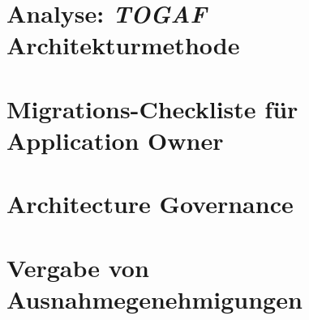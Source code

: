 \section{Analyse: \textit{TOGAF} Architekturmethode}
	\label{sec:analyse}
	

\section{Migrations-Checkliste für Application Owner}
	\label{sec:checkliste}
	

\section{Architecture Governance}
	\label{sec:governance}
	

\section{Vergabe von Ausnahmegenehmigungen}
	\label{sec:ausnahme}
	